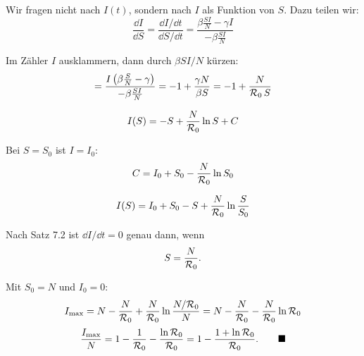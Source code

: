 \begin{merksatz}
Wir fragen nicht nach $I(t)$, sondern nach $I$ als Funktion von $S$. Dazu teilen wir:
\[ \frac{\dd I}{\dd S} = \frac{\dd I/\dd t}{\dd S/\dd t} = \frac{\beta\frac{SI}{N} - \gamma I}{-\beta\frac{SI}{N}} \]

Im Zähler $I$ ausklammern, dann durch $\beta SI/N$ kürzen:
\[ = \frac{I\left(\beta\frac{S}{N}-\gamma\right)}{-\beta\frac{SI}{N}} = -1 + \frac{\gamma N}{\beta S} = -1 + \frac{N}{\mathcal{R}_0\,S} \]

\begin{center}
\begin{minipage}{0.88\textwidth}
\end{minipage}
\end{center}

\[ I(S) = -S + \frac{N}{\mathcal{R}_0}\ln S + C \]

Bei $S = S_0$ ist $I = I_0$:
\[ C = I_0 + S_0 - \frac{N}{\mathcal{R}_0}\ln S_0 \]

\[ I(S) = I_0 + S_0 - S + \frac{N}{\mathcal{R}_0}\ln\frac{S}{S_0} \]

Nach Satz 7.2 ist $\dd I/\dd t = 0$ genau dann, wenn
\[ S = \frac{N}{\mathcal{R}_0} . \]

Mit $S_0 = N$ und $I_0 = 0$:
\[ I_{\max} = N - \frac{N}{\mathcal{R}_0} + \frac{N}{\mathcal{R}_0}\ln\frac{N/\mathcal{R}_0}{N} = N - \frac{N}{\mathcal{R}_0} - \frac{N}{\mathcal{R}_0}\ln\mathcal{R}_0 \]
\[ \frac{I_{\max}}{N} = 1 - \frac{1}{\mathcal{R}_0} - \frac{\ln\mathcal{R}_0}{\mathcal{R}_0} = 1 - \frac{1+\ln\mathcal{R}_0}{\mathcal{R}_0} . \qquad \blacksquare \]
\end{merksatz}

